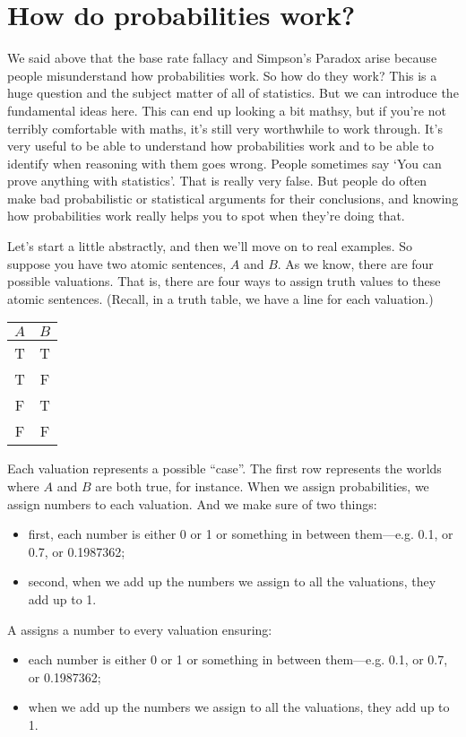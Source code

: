 \section{How do probabilities work?}

We said above that the base rate fallacy and Simpson's Paradox arise because people misunderstand how probabilities work. So how do they work? This is a huge question and the subject matter of all of statistics. But we can introduce the fundamental ideas here. This can end up looking a bit mathsy, but if you're not terribly comfortable with maths, it's still very worthwhile to work through. It's very useful to be able to understand how probabilities work and to be able to identify when reasoning with them goes wrong. People sometimes say `You can prove anything with statistics'. That is really very false. But people do often make bad probabilistic or statistical arguments for their conclusions, and knowing how probabilities work really helps you to spot when they're doing that.

Let's start a little abstractly, and then we'll move on to real examples. So suppose you have two atomic sentences, $A$ and $B$. As we know, there are four possible valuations.  That is, there are four ways to assign truth values to these atomic sentences. (Recall, in a truth table, we have a line for each valuation.)
\begin{center}
\begin{tabular}{cc}
$A$ & $B$ \\
\hline
T & T \\
T & F \\
F & T \\
F & F
\end{tabular}
\end{center}
Each valuation represents a possible ``case''. The first row represents the worlds where $A$ and $B$ are both true, for instance. 
When we assign probabilities, we assign numbers to each valuation. And we make sure of two things:
\begin{itemize}
\item first, each number is either 0 or 1 or something in between them---e.g. 0.1, or 0.7, or 0.1987362;
\item second, when we add up the numbers we assign to all the valuations, they add up to 1.
\end{itemize}

\begin{highlighted}
A  assigns a number to every valuation ensuring:
\begin{itemize}
\item each number is either 0 or 1 or something in between them---e.g. 0.1, or 0.7, or 0.1987362;
\item when we add up the numbers we assign to all the valuations, they add up to 1.
\end{itemize}
\end{highlighted}

